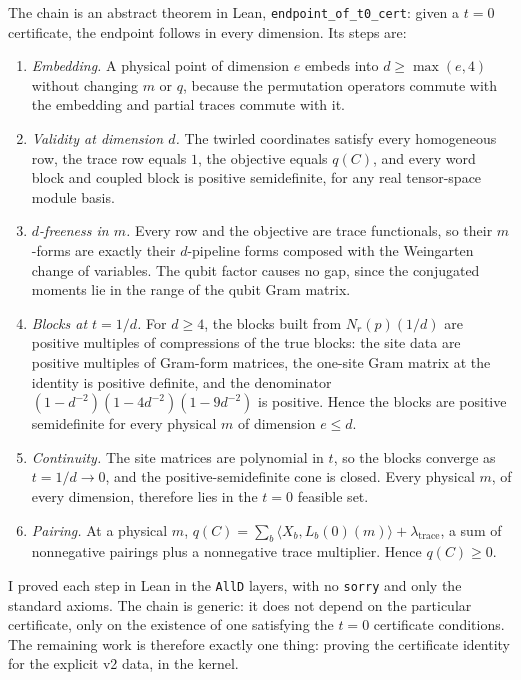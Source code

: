 \documentclass[11pt]{article}
\theoremstyle{remark}
\begin{document}
The chain is an abstract theorem in Lean, \texttt{endpoint\_of\_t0\_cert}:
given a $t = 0$ certificate, the endpoint follows in every dimension.
Its steps are:

\begin{enumerate}
\item \emph{Embedding.} A physical point of dimension $e$ embeds into
$d \ge \max(e, 4)$ without changing $m$ or $q$, because the permutation
operators commute with the embedding and partial traces commute with it.
\item \emph{Validity at dimension $d$.} The twirled coordinates
satisfy every homogeneous row, the trace row equals $1$, the objective
equals $q(C)$, and every word block and coupled block is positive
semidefinite, for any real tensor-space module basis.
\item \emph{$d$-freeness in $m$.} Every row and the objective are trace
functionals, so their $m$-forms are exactly their $d$-pipeline forms
composed with the Weingarten change of variables. The qubit factor
causes no gap, since the conjugated moments lie in the range of the
qubit Gram matrix.
\item \emph{Blocks at $t = 1/d$.} For $d \ge 4$, the blocks built from
$N_r(p)(1/d)$ are positive multiples of compressions of the true blocks:
the site data are positive multiples of Gram-form matrices, the
one-site Gram matrix at the identity is positive definite, and the
denominator $(1-d^{-2})(1-4d^{-2})(1-9d^{-2})$ is positive.
Hence the blocks are positive semidefinite for every physical $m$ of
dimension $e \le d$.
\item \emph{Continuity.} The site matrices are polynomial in $t$, so the
blocks converge as $t = 1/d \to 0$, and the positive-semidefinite cone
is closed. Every physical $m$, of every dimension, therefore lies in
the $t = 0$ feasible set.
\item \emph{Pairing.} At a physical $m$,
$q(C) = \sum_b \langle X_b, L_b(0)(m) \rangle + \lambda_{\mathrm{trace}}$,
a sum of nonnegative pairings plus a nonnegative trace multiplier.
Hence $q(C) \ge 0$.
\end{enumerate}

I proved each step in Lean in the \texttt{AllD} layers, with no
\texttt{sorry} and only the standard axioms.
The chain is generic: it does not depend on the particular certificate,
only on the existence of one satisfying the $t = 0$ certificate
conditions. The remaining work is therefore exactly one thing:
proving the certificate identity for the explicit v2 data, in the kernel.
\end{document}
